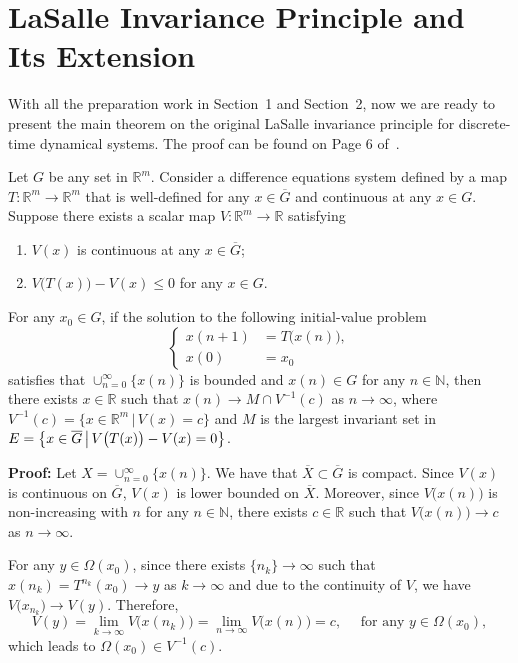 \documentclass[10pt]{svmult}
\begin{document}
\section{LaSalle Invariance Principle and Its Extension}
With all the preparation work in Section~1 and Section~2, now we are ready to present the main theorem on the original LaSalle invariance principle for discrete-time dynamical systems. The proof can be found on Page 6 of~\cite{JPL:76}.
\begin{theorem}\label{thm:classic-LaSalle}
Let $G$ be any set in $\mathbb{R}^m$. Consider a difference equations system defined by a map $T:\mathbb{R}^m \to \mathbb{R}^m$ that is well-defined for any $x\in \overline{G}$ and continuous at any $x\in G$. Suppose there exists a scalar map $V:\mathbb{R}^m \to \mathbb{R}$ satisfying
\begin{enumerate}[label=\roman*)]
\item $V(x)$ is continuous at any $x\in \overline{G}$;
\item $V\big( T(x) \big)-V(x)\le 0$ for any $x\in G$.
\end{enumerate} 
For any $x_0\in G$, if the solution to the following initial-value problem
\begin{equation*}
\begin{cases}
\displaystyle x(n+1) & = T\big( x(n) \big),\\
\displaystyle x(0) & = x_0
\end{cases}
\end{equation*}
satisfies that $\cup_{n=0}^{\infty}\{x(n)\}$ is bounded and $x(n)\in G$ for any $n\in \mathbb{N}$, then there exists $x\in \mathbb{R}$ such that $x(n)\to M\cap V^{-1}(c)$ as $n\to \infty$, where $V^{-1}(c)=\{x\in \mathbb{R}^m\,|\,V(x)=c\}$ and $M$ is the largest invariant set in $E=\big{\{} x\in \overline{G}\,\big|\, V\big( T(x) \big)-V(x)=0 \big{\}}$.
\end{theorem}

\textbf{Proof:} Let $X=\cup_{n=0}^{\infty}\{x(n)\}$. We have that $\overline{X}\subset \overline{G}$ is compact. Since $V(x)$ is continuous on $\overline{G}$, $V(x)$ is lower bounded on $\overline{X}$. Moreover, since $V\big(x(n)\big)$ is non-increasing with $n$ for any $n\in \mathbb{N}$, there exists $c\in \mathbb{R}$ such that $V\big( x(n) \big)\to c$ as $n\to \infty$.

For any $y\in \Omega(x_0)$, since there exists $\{n_k\}\to \infty$ such that $x(n_k)=T^{n_k}(x_0)\to y$ as $k\to \infty$ and due to the continuity of $V$, we have $V\big( x_{n_k} \big)\to V(y)$. Therefore,
\begin{equation*}
V(y) = \lim_{k\to \infty} V\big( x(n_k) \big) = \lim_{n\to \infty} V\big( x(n) \big) = c, \quad \text{ for any }y\in \Omega(x_0),
\end{equation*}
which leads to $\Omega(x_0)\in V^{-1}(c)$.
\end{document}
